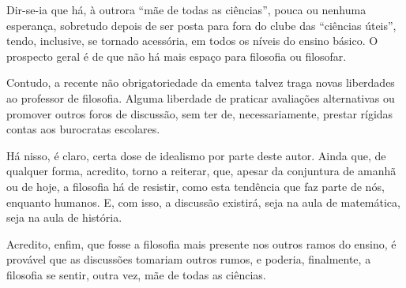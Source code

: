 \documentclass[12pt,a4paper]{article}
\begin{document}
	Dir-se-ia que há, à outrora “mãe de todas as ciências”, pouca ou 
	nenhuma esperança, sobretudo depois de ser posta para fora do clube 
	das “ciências úteis”, tendo, inclusive, se tornado acessória, em todos 
	os níveis do ensino básico. O prospecto geral é de que não há mais 
	espaço para filosofia ou filosofar. 

	Contudo, a recente não obrigatoriedade da ementa talvez traga novas 
	liberdades ao professor de filosofia. Alguma liberdade de praticar 
	avaliações alternativas ou promover outros foros de discussão, sem 
	ter de, necessariamente, prestar rígidas contas aos burocratas 
	escolares. 

	Há nisso, é claro, certa dose de idealismo por parte deste autor. 
	Ainda que, de qualquer forma, acredito, torno a reiterar, que, apesar 
	da conjuntura de amanhã ou de hoje, a filosofia há de resistir, como 
	esta tendência que faz parte de nós, enquanto humanos. E, com isso, 
	a discussão existirá, seja na aula de matemática, seja na aula de 
	história. 

	Acredito, enfim, que fosse a filosofia mais presente nos outros ramos 
	do ensino, é provável que as discussões tomariam outros rumos, e 
	poderia, finalmente, a filosofia se sentir, outra vez, mãe de todas 
	as ciências. 
	
	\newpage

	
		
		
\end{document}
